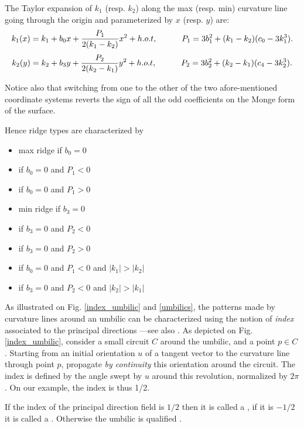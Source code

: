 \noindent The Taylor expansion of $k_1$ (resp. $k_2$) along the max
(resp. min) curvature line going through the origin and parameterized
by $x$ (resp. $y$) are:
\begin{equation}
\label{eq:taylor_along_line}
k_1(x) = k_1 + b_0x + \frac{P_1}{2(k_1-k_2)}x^2 +h.o.t , \quad \quad \quad
P_1= 3b_1^2+(k_1-k_2)(c_0-3k_1^3).
\end{equation}
%
\begin{equation}
\label{eq:taylor_along_red_line}
k_2(y) = k_2 + b_3y + \frac{P_2}{2(k_2-k_1)}y^2 +h.o.t , \quad \quad \quad
P_2= 3b_2^2+(k_2-k_1)(c_4-3k_2^3).
\end{equation}

\noindent Notice also that switching from one to the other of the two
afore-mentioned coordinate systems reverts the sign of all the odd
coefficients on the Monge form of the surface.
\medskip

Hence ridge types are characterized by 
\begin{itemize}
\item max ridge if $b_0=0$
\item {} if $b_0=0$ and $P_1<0$
\item {} if $b_0=0$ and $P_1>0$
\item min ridge if $b_3=0$
\item {} if $b_3=0$ and $P_2<0$
\item {} if $b_3=0$ and $P_2>0$
\item {} if $b_0=0$ and $P_1<0$ and $|k_1|>|k_2|$
\item {} if $b_3=0$ and $P_2<0$ and $|k_2|>|k_1|$
\end{itemize}


As illustrated on Fig.  \ref{index_umbilic} and \ref{umbilics}, the
patterns made by curvature lines around an umbilic can be
characterized using the notion of {\em index} associated to the
principal directions ---see also \cite{cgal:cp-ssulc-05}.
As depicted on Fig. \ref{index_umbilic}, consider a small circuit $C$ around the
umbilic, and a point $p \in C$. Starting from an initial orientation
$u$ of a tangent vector to the curvature line through point $p$,
propagate {\em by continuity} this orientation around the circuit.  The
index is defined by the angle swept by $u$ around this revolution,
normalized by $2\pi$. On our example, the index is thus 1/2.

If the index of the principal direction field is $1/2$
then it is called a
, if it is $-1/2$ it is called a .
 Otherwise the umbilic is qualified
.


